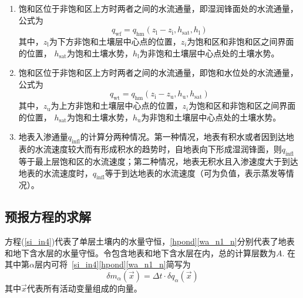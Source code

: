 \begin{enumerate}
  \item 饱和区位于非饱和区上方时两者之间的水流通量，即湿润锋面处的水流通量，公式为
    \begin{equation}
      q_{\mathrm{wf}}=q_{\mathrm{h m}}\left(z_{\mathrm{l}}-z_{\mathrm{i}}, h_{\mathrm{sat}}, h_{\mathrm{l}}\right)
    \end{equation}
    其中，$z_{\mathrm {l}} $为下方非饱和土壤层中心点的位置，$z_i$为饱和区和非饱和区之间界面的位置，
    $h_{\mathrm {sat}} $为饱和土壤水势，$h_{\mathrm {l}} $为非饱和土壤层中心点处的土壤水势。

  \item 饱和区位于非饱和区上方时两者之间的水流通量，即饱和水位处的水流通量，公式为
    \begin{equation}
      q_{\mathrm{wt}}=q_{\mathrm{h m}}\left(z_{\mathrm{i}}-z_{\mathrm{u}}, h_{\mathrm{u}}, h_{\mathrm{sat}}\right)
    \end{equation}
    其中，$z_{\mathrm {u}} $为上方非饱和土壤层中心点的位置，$z_i$为饱和区和非饱和区之间界面的位置，
    $h_{\mathrm {sat}} $为饱和土壤水势，$h_{\mathrm {u}} $为非饱和土壤层中心点处的土壤水势。

  \item 地表入渗通量$q_{\mathrm{infl}}$的计算分两种情况。第一种情况，地表有积水或者因到达地表的水流速度较大而有形成积水的趋势时，自地表向下形成湿润锋面，则$q_{\mathrm{infl}}$等于最上层饱和区的水流速度；第二种情况，地表无积水且入渗速度大于到达地表的水流速度时，$q_{\mathrm{infl}}$等于到达地表的水流速度（可为负值，表示蒸发等情况）。

\end{enumerate}


\subsection{预报方程的求解}
方程(\ref{si_in4})代表了单层土壤内的水量守恒，\eqref{hpond}\eqref{wa_n1_n}分别代表了地表和地下含水层的水量守恒。令包含地表和地下含水层在内，总的计算层数为$A$. 在其中第$\alpha$层内可将~\eqref{si_in4}\eqref{hpond}\eqref{wa_n1_n}简写为
\begin{equation}\label{m_alpha_x}
  \delta m_{\alpha}(\vec{x})=\Delta t \cdot \delta q_{\alpha}(\vec{x})
\end{equation}
其中$\vec{x}$代表所有活动变量组成的向量。

